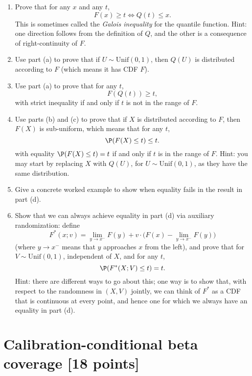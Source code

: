 \documentclass{article}
\begin{document}
\begin{enumerate}[label=(\alph*)]
\item Prove that for any $x$ and any $t$, 
  \marginpar{\small [3 pts]}
  \[
  F(x) \geq t \iff Q(t) \leq x.
  \]
  This is sometimes called the \emph{Galois inequality} for the quantile
  function. Hint: one direction follows from the definition of $Q$, and the
  other is a consequence of right-continuity of $F$.  

\item Use part (a) to prove that if $U \sim \mathrm{Unif}(0,1)$, then $Q(U)$ is
  distributed according to $F$ (which means it has CDF $F$).
  \marginpar{\small [2 pts]}

\item Use part (a) to prove that for any $t$, 
  \marginpar{\small [2 pts]}
  \[
  F(Q(t)) \geq t,
  \]
  with strict inequality if and only if $t$ is not in the range of $F$. 

\item Use parts (b) and (c) to prove that if $X$ is distributed according to
  $F$, then $F(X)$ is sub-uniform, which means that for any $t$, 
  \marginpar{\small [3 pts]}
  \[
  \P(F(X) \leq t) \leq t.
  \]
  with equality $\P(F(X) \leq t) = t$ if and only if $t$ is in the range of
  $F$. Hint: you may start by replacing $X$ with $Q(U)$, for $U \sim
  \mathrm{Unif}(0,1)$, as they have the same distribution.  
  
\item Give a concrete worked example to show when equality fails in the result  
  in part (d).
  \marginpar{\small [2 pts]}

\item Show that we can always achieve equality in part (d) via auxiliary
  randomization: define 
  \[
  F^*(x; v) =  \lim_{y \to x^-} F(y) + v \cdot \Big( F(x) - \lim_{y \to x^-}
  F(y) \Big)
  \]
  (where $y \to x^-$ means that $y$ approaches $x$ from the left), and prove
  that for $V \sim \mathrm{Unif}(0,1)$, independent of $X$, and for any $t$,   
  \marginpar{\small [3 pts]}
  \[
  \P(F^*(X; V) \leq t) = t.
  \]
  Hint: there are different ways to go about this; one way is to show that, with
  respect to the randomness in $(X,V)$ jointly, we can think of $F^*$ as a CDF 
  that is continuous at every point, and hence one for which we always have an
  equality in part (d). 
\end{enumerate}

\section{Calibration-conditional beta coverage [18 points]}
\end{document}

